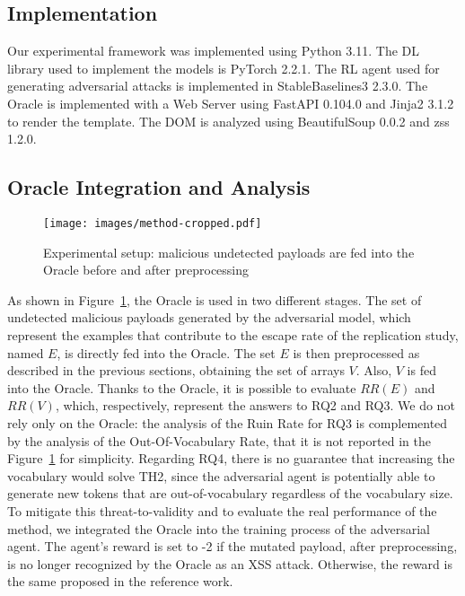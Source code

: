 \subsection{Implementation}

Our experimental framework was implemented using Python 3.11. The DL library used to implement the models is PyTorch 2.2.1. The RL agent used for generating adversarial attacks is implemented in StableBaselines3 2.3.0.
The Oracle is implemented with a Web Server using FastAPI 0.104.0 and Jinja2 3.1.2 to render the template. The DOM is analyzed using BeautifulSoup 0.0.2 and zss 1.2.0.


\subsection{Oracle Integration and Analysis}

\begin{figure}[!ht]
  \centering
  \texttt{[image: images/method-cropped.pdf]}
  \caption{Experimental setup: malicious undetected payloads are fed into the Oracle before and after  preprocessing}\label{fig:experiments}
\end{figure}

As shown in Figure~\ref{fig:experiments}, the Oracle is used in two different stages.
The set of undetected malicious payloads generated by the adversarial model, which represent the examples that contribute to the escape rate of the replication study, named $E$, is directly fed into the Oracle.
The set $E$ is then preprocessed as described in the previous sections, obtaining the set of arrays $V$.
Also, $V$ is fed into the Oracle. %
Thanks to the Oracle, it is possible to evaluate $RR(E)$ and $RR(V)$, which, respectively, represent the answers to RQ2 and RQ3.
We do not rely only on the Oracle: the analysis of the Ruin Rate for RQ3 is complemented by the analysis of the Out-Of-Vocabulary Rate, that it is not reported in the Figure~\ref{fig:experiments} for simplicity. %
Regarding RQ4, there is no guarantee that increasing the vocabulary would solve TH2, since the adversarial agent is potentially able to generate new tokens that are out-of-vocabulary regardless of the vocabulary size.
To mitigate this threat-to-validity and to evaluate the real performance of the method, we integrated the Oracle into the training process of the adversarial agent.
The agent's reward is set to -2 if the mutated payload, after  preprocessing, is no longer recognized by the Oracle as an XSS attack.
Otherwise, the reward is the same proposed in the reference work.

